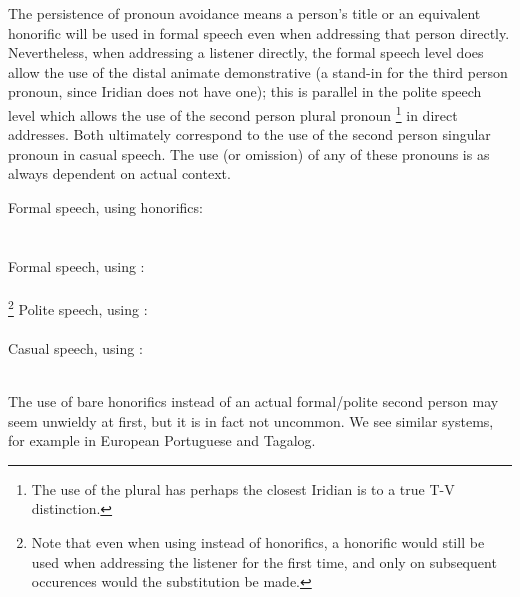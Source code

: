 The persistence of pronoun avoidance means a person's title or an equivalent honorific will be used in formal speech even when addressing that person directly. Nevertheless, when addressing a listener directly, the formal speech level does allow the use of the distal animate demonstrative  (a stand-in for the third person pronoun, since Iridian does not have one); this is parallel in the polite speech level which allows the use of the second person plural pronoun \footnote{The use of the plural  has perhaps the closest Iridian is to a true T-V distinction.} in direct addresses. Both ultimately correspond to the use of the second person singular pronoun  in casual speech. The use (or omission) of any of these pronouns is as always dependent on actual context.

\pex
	\a Formal speech, using honorifics:\\
	\\
	\medskip\\
	Formal speech, using :\\
	\\
	\footnote{Note that even when using  instead of honorifics, a honorific would still be used when addressing the listener for the first time, and only on subsequent occurences would the substitution be made.}
	\a Polite speech, using :\\
	\\
	\a Casual speech, using :\\
	\\
\xe

The use of bare honorifics instead of an actual formal/polite second person may seem unwieldy at first, but it is in fact not uncommon. We see similar systems, for example in European Portuguese and Tagalog.


